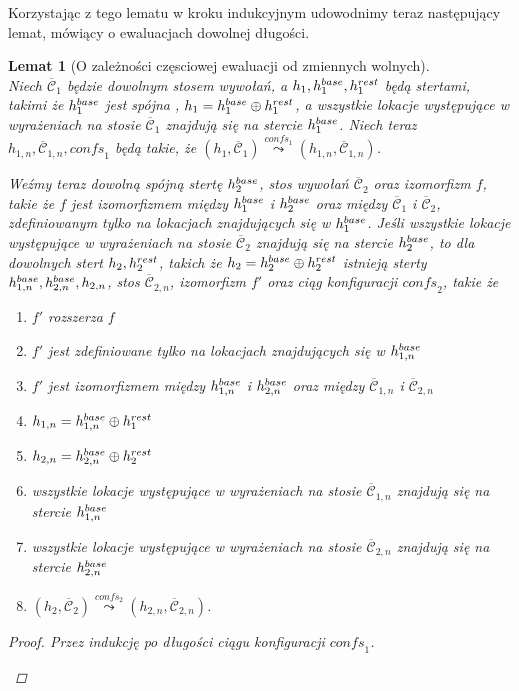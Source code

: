 \documentclass[]{pracamgr}
\renewcommand \| {\hspace{0.75em} | \hspace{0.75em} }
\renewcommand \[ {[\![}
\renewcommand \] {]\!]}
\newcommand \eval [1] {\overset{#1}{\leadsto}}
\newtheorem{lemma}{Lemat}
\theoremstyle{definition}
\newcommand{\ctxt}{\mathcal{C}\xspace}
\newcommand{\ctxts}{\overline{\ctxt}}
\begin{document}
Korzystając z tego lematu w kroku indukcyjnym udowodnimy teraz następujący lemat,
mówiący o ewaluacjach dowolnej długości.

\begin{lemma}[O zależności częsciowej ewaluacji od zmiennych wolnych]{\ } \\
\label{lem:free_part_eval}
Niech $\ctxts_1$ będzie dowolnym stosem wywołań, a $h_1, h^{base}_1, h^{rest}_1$ będą stertami,
takimi że $h^{base}_1$ jest spójna , $h_1 = h^{base}_1 \oplus h^{rest}_1$,
a wszystkie lokacje występujące w wyrażeniach na stosie $\ctxts_1$ znajdują się na stercie $h^{base}_1$.
Niech teraz $h_{1, n}, \ctxts_{1, n}, \mathit{confs}_1$ będą takie,
że $(h_1, \ctxts_1) \eval{confs_1} (h_{1, n}, \ctxts_{1, n})$.

Weźmy teraz dowolną spójną stertę $h^{base}_2$, stos wywołań $\ctxts_2$ oraz izomorfizm $f$,
takie że $f$ jest izomorfizmem między $h^{base}_1$ i $h^{base}_2$ oraz między $\ctxts_1$ i $\ctxts_2$,
zdefiniowanym tylko na lokacjach znajdujących się w $h^{base}_1$.
Jeśli wszystkie lokacje występujące w wyrażeniach na stosie $\ctxts_2$
znajdują się na stercie $h^{base}_2$, to dla dowolnych stert $h_2, h^{rest}_2$, takich że $h_2 = h^{base}_2 \oplus h^{rest}_2$
istnieją sterty $h^{base}_{1, n}, h^{base}_{2, n}, h_{2, n}$, stos $\ctxts_{2, n}$, izomorfizm $f'$
oraz ciąg konfiguracji $\mathit{confs}_2$, takie że
\begin{enumerate}
 \item $f'$ rozszerza $f$
 \item $f'$ jest zdefiniowane tylko na lokacjach znajdujących się w $h^{base}_{1, n}$
 \item $f'$ jest izomorfizmem między $h^{base}_{1,n}$ i $h^{base}_{2,n}$ oraz między $\ctxts_{1,n}$ i $\ctxts_{2,n}$
 \item $h_{1, n} = h^{base}_{1, n} \oplus h^{rest}_1$
 \item $h_{2, n} = h^{base}_{2, n} \oplus h^{rest}_2$
 \item wszystkie lokacje występujące w wyrażeniach na stosie $\ctxts_{1, n}$ znajdują się na stercie $h^{base}_{1, n}$
 \item wszystkie lokacje występujące w wyrażeniach na stosie $\ctxts_{2, n}$ znajdują się na stercie $h^{base}_{2, n}$
 \item $(h_2, \ctxts_2) \eval{confs_2} (h_{2, n}, \ctxts_{2, n})$.
\end{enumerate}
\begin{proof}
Przez indukcję po długości ciągu konfiguracji $\mathit{confs}_1$.
\begin{itemize}

\end{itemize}
\end{proof}
\end{lemma}
\end{document}

